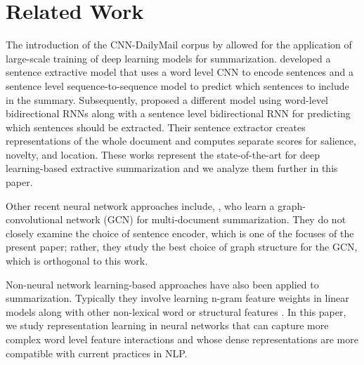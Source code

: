 
\section{Related Work}

The introduction of the CNN-DailyMail corpus by \citet{nips15_hermann} 
allowed for the application of large-scale training of deep learning models 
for summarization.
\citet{cheng2016neural} developed a sentence extractive model that uses a 
word level CNN to encode sentences and a sentence level sequence-to-sequence 
model to predict which sentences to include in the summary. Subsequently, 
\citet{nallapati2017summarunner} proposed a different model using word-level 
bidirectional RNNs along with a sentence level 
bidirectional RNN for predicting which sentences should be extracted. 
Their sentence extractor creates representations of the whole document and 
computes separate scores for salience, novelty, and location.
These works represent the state-of-the-art for deep learning-based extractive
summarization and we analyze them further in this paper.

Other recent neural network approaches include, \citet{yasunaga2017graph},
who learn a graph-convolutional network (GCN) for multi-document summarization.
They do not 
closely examine the choice of sentence encoder, which is one of the focuses
of the present paper; rather, they study the best choice of graph 
structure for the GCN, which is orthogonal to this work. 

Non-neural network learning-based approaches have also been applied
to summarization. Typically they involve learning n-gram feature weights 
in linear models along with other non-lexical word or 
structural features 
\cite{berg2011jointly,sipos2012large,durrett2016learning}.
In this paper, we study representation learning in
neural networks that can capture more complex word level feature interactions
and whose dense representations are more compatible with current practices
in NLP.







